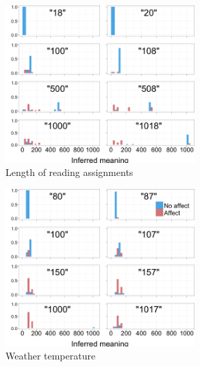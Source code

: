 \documentclass{article} %
\begin{document}
\begin{figure}[b]
	\centering
	\includegraphics[width=0.65\textwidth]{humans_reading_all.png}
	\caption{Length of reading assignments}
\end{figure}

\begin{figure}[h]
	\centering
	\includegraphics[width=0.65\textwidth]{humans_weather_all.png}
	\caption{Weather temperature}
\end{figure}
\end{document}
